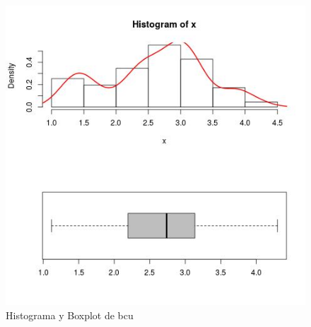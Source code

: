 \documentclass{article}
\begin{document}
\begin{figure}[h!]
\centering
\includegraphics[scale=0.5]{./plots/histplot_bcu.png}
\caption{Histograma y Boxplot de bcu}
\end{figure}
\end{document}
